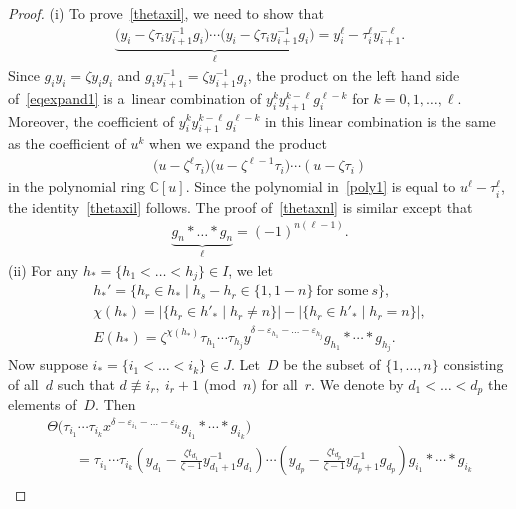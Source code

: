 \documentclass[pdftex]{sigma}
\numberwithin{equation}{section}
\begin{document}
\begin{proof}
(i) To prove~\eqref{thetaxil}, we need to show that
\begin{gather}
\label{eqexpand1}
\underbrace{\big(y_i - \zeta \tau_i y_{i+1}^{-1}g_i\big)
\cdots
\big(y_i - \zeta \tau_i y_{i+1}^{-1}g_i\big)}_\ell = y_i^\ell - \tau_i^\ell y_{i+1}^{-\ell}.
\end{gather}
Since $g_iy_i=\zeta y_i g_i$ and $g_i y_{i+1}^{-1} = \zeta y_{i+1}^{-1} g_i$, the product on the left hand side
of~\eqref{eqexpand1} is a~linear combination of $y_i^k y_{i+1}^{k-\ell} g_i^{\ell-k}$ for $k=0, 1,\ldots, \ell$.
Moreover, the coef\/f\/icient of $y_i^k y_{i+1}^{k-\ell} g_i^{\ell-k}$ in this linear combination is the same as the
coef\/f\/icient of $u^k$ when we expand the product
\begin{gather}
\label{poly1}
\big(u- \zeta^\ell \tau_i\big) \big(u- \zeta^{\ell-1} \tau_i\big) \cdots (u- \zeta \tau_i)
\end{gather}
in the polynomial ring ${\mathbb{C}}[u]$.
Since the polynomial in~\eqref{poly1} is equal to $u^\ell-\tau_i^\ell$, the identity~\eqref{thetaxil} follows.
The proof of~\eqref{thetaxnl} is similar except that
\begin{gather*}
\underbrace{g_n * \dots * g_n}_\ell = (-1)^{n(\ell-1)}.
\end{gather*}
(ii) For any $h_*=\{h_1<\dots<h_j\} \in I$, we let
\begin{gather*}
h_*' = \{h_r\in h_* \mid h_s-h_r \in \{1, 1-n\}\ \text{for some}\ s \},
\\
\chi(h_*) = |\{h_r\in h'_* \mid h_r\neq n \}| - |\{h_r\in h'_* \mid h_r=n \}|,
\\
E(h_*) = \zeta^{\chi (h_*)} \tau_{h_1} \cdots \tau_{h_j} y^{\delta - \varepsilon_{h_1} - \dots - \varepsilon_{h_j}}
g_{h_1} * \cdots * g_{h_j}.
\end{gather*}
Now suppose $i_*=\{i_1<\dots<i_k\}\in J$.
Let~$D$ be the subset of $\{1,\dots,n\}$ consisting of all~$d$ such that $d \not\equiv i_r,\ i_r+1$ (mod~$n$) for all~$r$.
We denote by $d_1 < \dots < d_p$ the elements of~$D$.
Then
\begin{gather*}
\Theta\big(\tau_{i_1}\cdots \tau_{i_k} x^{\delta-\varepsilon_{i_1} - \dots - \varepsilon_{i_k}} g_{i_1}*\cdots * g_{i_k}\big)
\\
\qquad
= \tau_{i_1}\cdots \tau_{i_k} \left(y_{d_1} - \frac{\zeta t_{d_1}}{\zeta-1}y_{d_1+1}^{-1}g_{d_1} \right) \cdots
\left(y_{d_p} - \frac{\zeta t_{d_p}}{\zeta-1}y_{d_p+1}^{-1}g_{d_p} \right) g_{i_1}*\cdots * g_{i_k}
\\

\end{gather*}
\end{proof}
\end{document}
